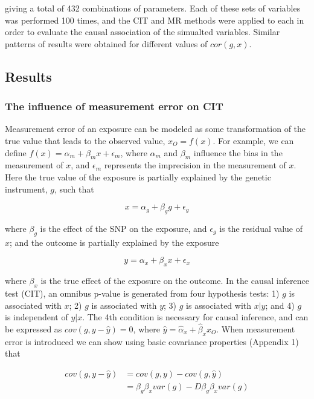 \documentclass[]{article}
\begin{document}
giving a total of 432 combinations of parameters. Each of these sets of
variables was performed 100 times, and the CIT and MR methods were
applied to each in order to evaluate the causal association of the
simualted variables. Similar patterns of results were obtained for
different values of $cor(g, x)$.

\subsection{Results}\label{results}

\subsubsection{The influence of measurement error on
CIT}\label{the-influence-of-measurement-error-on-cit}

Measurement error of an exposure can be modeled as some transformation
of the true value that leads to the observed value, $x_O=f(x)$. For
example, we can define $f(x) = \alpha_m + \beta_m x + \epsilon_m$, where
$\alpha_m$ and $\beta_m$ influence the bias in the measurement of $x$,
and $\epsilon_m$ represents the imprecision in the measurement of $x$.
Here the true value of the exposure is partially explained by the
genetic instrument, $g$, such that

\[
x = \alpha_g + \beta_g g + \epsilon_g
\]

where $\beta_g$ is the effect of the SNP on the exposure, and
$\epsilon_g$ is the residual value of $x$; and the outcome is partially
explained by the exposure

\[
y = \alpha_x + \beta_x x + \epsilon_x
\]

where $\beta_x$ is the true effect of the exposure on the outcome. In
the causal inference test (CIT), an omnibus p-value is generated from
four hypothesis tests: 1) $g$ is associated with $x$; 2) $g$ is
associated with $y$; 3) $g$ is associated with $x|y$; and 4) $g$ is
independent of $y|x$. The 4th condition is necessary for causal
inference, and can be expressed as $cov(g, y - \hat{y}) = 0$, where
$\hat{y} = \hat{\alpha}_x + \hat{\beta}_x x_O$. When measurement error
is introduced we can show using basic covariance properties (Appendix 1)
that

\[
\begin{aligned}
cov(g, y - \hat{y}) & = cov(g, y) - cov(g, \hat{y})  \\
                    & = \beta_g \beta_x var(g) - D\beta_g \beta_x var(g)
\end{aligned}
\]
\end{document}

